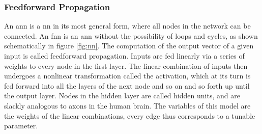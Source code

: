 \subsubsection*{Feedforward Propagation}
An \gls{ann} is a \gls{nn} in its most general form, where all nodes in the network can be connected. An \gls{fnn} is an \gls{ann} without the possibility of loops and cycles, as shown schematically in figure \ref{fig:nn}. The computation of the output vector of a given input is called feedforward propagation. Inputs are fed linearly via a series of weights to every node in the first layer. The linear combination of inputs then undergoes a nonlinear transformation called the activation, which at its turn is fed forward into all the layers of the next node and so on and so forth up until the output layer. Nodes in the hidden layer are called hidden units, and are slackly analogous to axons in the human brain. The variables of this model are the weights of the linear combinations, every edge thus corresponds to a tunable parameter. \\


